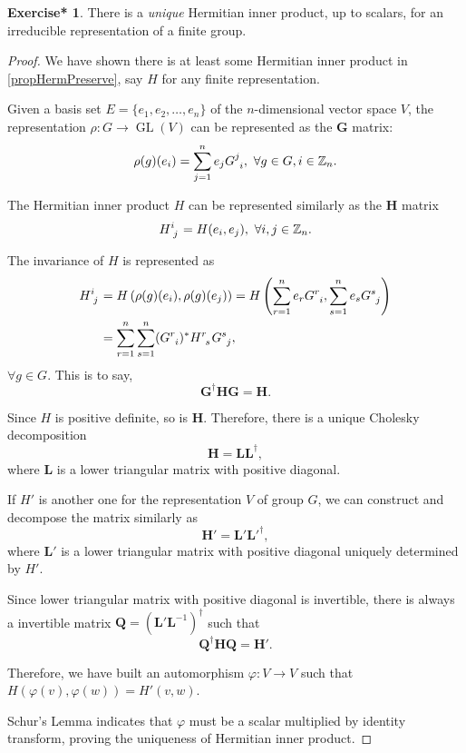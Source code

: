 \documentclass[12pt, letterpaper]{article}
\newcommand{\inte}{\mathbb{Z}}
\newcommand{\GL}{\operatorname{GL}}
\newcommand{\id}{\indices}
\newcommand{\hadj}[1]{{#1}^{\dagger}}
\theoremstyle{definition}
\theoremstyle{remark}
\theoremstyle{definition}
\newtheorem{exe*}[exe]{Exercise*}
\theoremstyle{plain}
\numberwithin{equation}{section}
\begin{document}
	\begin{exe*}\label{exe1.14}
		There is a \textit{unique} Hermitian inner product, up to scalars, for an irreducible representation of a finite group.
	\end{exe*}
	\begin{proof}
		We have shown there is at least some Hermitian inner product
		in \autoref{propHermPreserve}, say $H$ for any finite representation.
		
		Given a basis set $E=\{e_1,e_2,\dots,e_n\}$ of the $n$-dimensional vector space $V$,
		the representation $\rho \colon G \to \GL(V)$ can be represented as the $\mathbf{G}$ matrix:
		\[\rho(g)(e_i)=\sum_{j=1}^{n}e_jG\id{^j_i},\,\,\forall g\in G, i\in \inte_n. \]
		
		The Hermitian inner product $H$ can be represented similarly as the $\mathbf{H}$ matrix
		\[ H\id{^i_j}=H(e_i,e_j),\,\,\forall i, j\in \inte_n. \]
		
		The invariance of $H$ is represented as
		\[\begin{aligned}
			H\id{^i_j}&=H\left(\rho(g)(e_i),\rho(g)(e_j)\right)
			=H\left(\sum_{r=1}^{n}e_rG\id{^r_i},\sum_{s=1}^{n}e_sG\id{^s_j}\right)\\
			&=\sum_{r=1}^n\sum_{s=1}^n(G\id{^r_i})^{*}H\id{^r_s}G\id{^s_j},
		\end{aligned}\]
		$\forall g\in G$. This is to say, \[\hadj{\mathbf{G}}\mathbf{H}\mathbf{G}=\mathbf{H}.\]
		
		Since $H$ is positive definite, so is $\mathbf{H}$.
		Therefore, there is a unique Cholesky decomposition
		\[\mathbf{H}=\mathbf{L}\hadj{\mathbf{L}},\]
		where $\mathbf{L}$ is a lower triangular matrix with positive diagonal.
		
		If $H'$ is another one for the representation $V$ of group $G$,
		we can construct and decompose the matrix similarly as
		\[\mathbf{H}'=\mathbf{L}'\hadj{\mathbf{L}'},\]
		where $\mathbf{L}'$ is a lower triangular matrix with positive diagonal uniquely determined by $H'$.
		
		Since lower triangular matrix with positive diagonal is invertible,
		there is always a invertible matrix $\mathbf{Q}=\hadj{\left(\mathbf{L}'\mathbf{L}^{-1}\right)}$
		such that
		\[\hadj{\mathbf{Q}}\mathbf{H}\mathbf{Q}=\mathbf{H}'.\]
		
		Therefore, we have built an automorphism $\varphi\colon V\to V$
		such that $H(\varphi (v), \varphi (w))=H'(v,w)$.
		
		Schur's Lemma indicates that $\varphi$ must be a scalar multiplied by identity transform,
		proving the uniqueness of Hermitian inner product.
		
		
	\end{proof}
\end{document}
